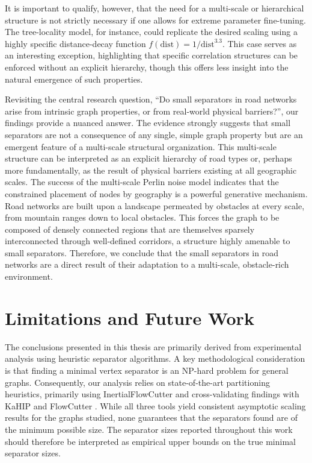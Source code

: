 It is important to qualify, however, that the need for a multi-scale or hierarchical structure is not strictly necessary if one allows for extreme parameter fine-tuning.
The tree-locality model, for instance, could replicate the desired scaling using a highly specific distance-decay function \(f(\text{dist}) = 1/\text{dist}^{3.3}\).
This case serves as an interesting exception, highlighting that specific correlation structures can be enforced without an explicit hierarchy, though this offers less insight into the natural emergence of such properties.

Revisiting the central research question, \enquote{Do small separators in road networks arise from intrinsic graph properties, or from real-world physical barriers?}, our findings provide a nuanced answer.
The evidence strongly suggests that small separators are not a consequence of any single, simple graph property but are an emergent feature of a multi-scale structural organization.
This multi-scale structure can be interpreted as an explicit hierarchy of road types or, perhaps more fundamentally, as the result of physical barriers existing at all geographic scales.
The success of the multi-scale Perlin noise model indicates that the constrained placement of nodes by geography is a powerful generative mechanism.
Road networks are built upon a landscape permeated by obstacles at every scale, from mountain ranges down to local obstacles.
This forces the graph to be composed of densely connected regions that are themselves sparsely interconnected through well-defined corridors, a structure highly amenable to small separators.
Therefore, we conclude that the small separators in road networks are a direct result of their adaptation to a multi-scale, obstacle-rich environment.

\section{Limitations and Future Work}
\label{sec:conclusion:future_work}

The conclusions presented in this thesis are primarily derived from experimental analysis using heuristic separator algorithms.
A key methodological consideration is that finding a minimal vertex separator is an NP-hard problem for general graphs.
Consequently, our analysis relies on state-of-the-art partitioning heuristics, primarily using InertialFlowCutter \cite{gottesburen_faster_2019} and cross-validating findings with KaHIP \cite{sanders_think_2013} and FlowCutter \cite{hamann_graph_2018}.
While all three tools yield consistent asymptotic scaling results for the graphs studied, none guarantees that the separators found are of the minimum possible size.
The separator sizes reported throughout this work should therefore be interpreted as empirical upper bounds on the true minimal separator sizes.

